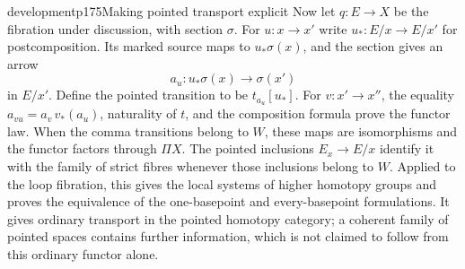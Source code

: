 \begin{dcomment}{development}{p175}{Making pointed transport explicit}
Now let $q:E\to X$ be the fibration under discussion, with section $\sigma$. For $u:x\to x'$ write $u_*:E/x\to E/x'$ for postcomposition. Its marked source maps to $u_*\sigma(x)$, and the section gives an arrow
\[
 a_u:u_*\sigma(x)\longrightarrow\sigma(x')
\]
in $E/x'$. Define the pointed transition to be $t_{a_u}[u_*]$. For $v:x'\to x''$, the equality $a_{vu}=a_v\,v_*(a_u)$, naturality of $t$, and the composition formula prove the functor law. When the comma transitions belong to $W$, these maps are isomorphisms and the functor factors through $\Pi X$. The pointed inclusions $E_x\to E/x$ identify it with the family of strict fibres whenever those inclusions belong to $W$. Applied to the loop fibration, this gives the local systems of higher homotopy groups and proves the equivalence of the one-basepoint and every-basepoint formulations. It gives ordinary transport in the pointed homotopy category; a coherent family of pointed spaces contains further information, which is not claimed to follow from this ordinary functor alone.
\end{dcomment}

